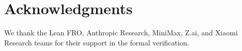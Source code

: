 \section*{Acknowledgments}\label{sec:ack}

We thank the Lean FRO, Anthropic Research, MiniMax, Z.ai, and Xiaomi Research teams for their support in the formal verification.
